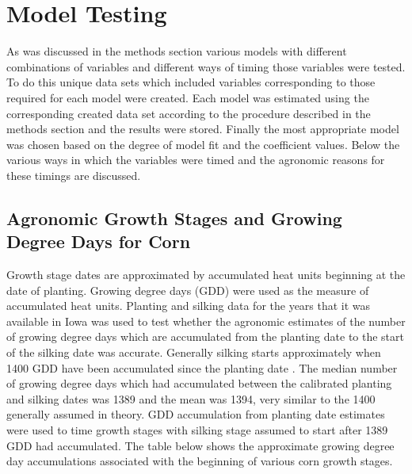 \section{Model Testing}

As was discussed in the methods section various models with different combinations of variables and different ways of timing those variables were tested. To do this unique data sets which included variables corresponding to those required for each model were created. Each model was estimated using the corresponding created data set according to the procedure described in the methods section and the results were stored. Finally the most appropriate model was chosen based on the degree of model fit and the coefficient values. Below the various ways in which the variables were timed and the agronomic reasons for these timings are discussed.

\subsection{Agronomic Growth Stages and Growing Degree Days for Corn}

Growth stage dates are approximated by accumulated heat units beginning at the date of planting. Growing degree days (GDD) were used as the measure of accumulated heat units. Planting and silking data for the years that it was available in Iowa was used to test whether the agronomic estimates of the number of growing degree days which are accumulated from the planting date to the start of the silking date was accurate. Generally silking starts approximately when 1400 GDD have been accumulated since the planting date \citep{neild1987growing}. The median number of growing degree days which had accumulated between the calibrated planting and silking dates was 1389 and the mean was 1394, very similar to the 1400 generally assumed in theory. GDD accumulation from planting date estimates were used to time growth stages with silking stage assumed to start after 1389 GDD had accumulated. The table below shows the approximate growing degree day accumulations associated with the beginning of various corn growth stages.

